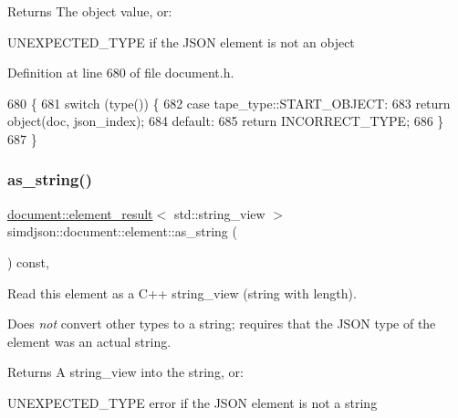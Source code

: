 \begin{DoxyReturn}{Returns}
The object value, or\+:
\begin{DoxyItemize}
\item U\+N\+E\+X\+P\+E\+C\+T\+E\+D\+\_\+\+T\+Y\+PE if the J\+S\+ON element is not an object 
\end{DoxyItemize}
\end{DoxyReturn}


Definition at line 680 of file document.\+h.


\begin{DoxyCode}
680                                                                                         \{
681   \textcolor{keywordflow}{switch} (type()) \{
682     \textcolor{keywordflow}{case} tape\_type::START\_OBJECT:
683       \textcolor{keywordflow}{return} object(doc, json\_index);
684     \textcolor{keywordflow}{default}:
685       \textcolor{keywordflow}{return} INCORRECT\_TYPE;
686   \}
687 \}
\end{DoxyCode}
\mbox{\label{classsimdjson_1_1document_1_1element_a2467d0f9e039451767947dab82622331}} 
\subsubsection{\texorpdfstring{as\+\_\+string()}{as\_string()}}
{\footnotesize\ttfamily \hyperlink{classsimdjson_1_1document_1_1element__result}{document\+::element\+\_\+result}$<$ std\+::string\+\_\+view $>$ simdjson\+::document\+::element\+::as\+\_\+string (\begin{DoxyParamCaption}{ }\end{DoxyParamCaption}) const\hspace{0.3cm}{\ttfamily [inline]}, {\ttfamily [noexcept]}}



Read this element as a C++ string\+\_\+view (string with length). 

Does {\itshape not} convert other types to a string; requires that the J\+S\+ON type of the element was an actual string.

\begin{DoxyReturn}{Returns}
A {\ttfamily string\+\_\+view} into the string, or\+:
\begin{DoxyItemize}
\item U\+N\+E\+X\+P\+E\+C\+T\+E\+D\+\_\+\+T\+Y\+PE error if the J\+S\+ON element is not a string 
\end{DoxyItemize}
\end{DoxyReturn}


